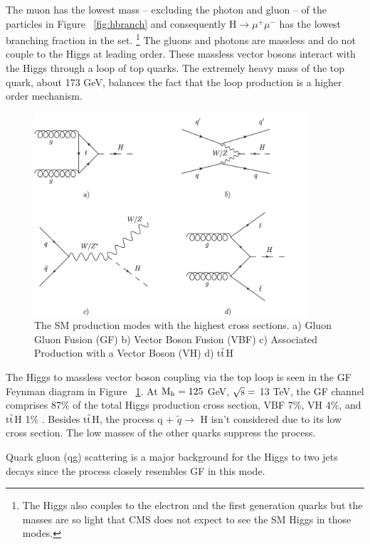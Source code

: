 The muon has the lowest mass -- excluding the photon and gluon -- of the particles in Figure ~\ref{fig:hbranch} and consequently H$\rightarrow \mu^{+}\mu^{-}$ has the lowest branching fraction in the set. \footnote{The Higgs also couples to the electron and the first generation quarks but the masses are so light that CMS does not expect to see the SM Higgs in those modes.} The gluons and photons are massless and do not couple to the Higgs at leading order. These massless vector bosons interact with the Higgs through a loop of top quarks. The extremely heavy mass of the top quark, about 173 GeV, balances the fact that the loop production is a higher order mechanism.  
\begin{figure}[h!]
  \centering
  \includegraphics[width=4in]{images/higgs_production_modes.png}
  \caption
   {The SM production modes with the highest cross sections. a) Gluon Gluon Fusion (GF) b) Vector Boson Fusion (VBF) c) Associated Production with a Vector Boson (VH) d) ${\rm t\tilde{t}}$H}
  \label{fig:hfeynprod}
\end{figure}

The Higgs to massless vector boson coupling via the top loop is seen in the GF Feynman diagram in Figure ~\ref{fig:hfeynprod}. At ${\rm M_{h} = 125}$ GeV, ${\rm \sqrt{s} =}$ 13 TeV, the GF channel comprises 87\% of the total Higgs production cross section, VBF 7\%, VH 4\%, and ${\rm t\tilde{t}}$H 1\% \cite{crossbranchplots}. Besides ${\rm t\tilde{t}}$H, the process q + $\tilde{q} \rightarrow$ H isn't considered due to its low cross section. The low masses of the other quarks suppress the process. 

Quark gluon (qg) scattering is a major background for the Higgs to two jets decays since the process closely resembles GF in this mode.   

